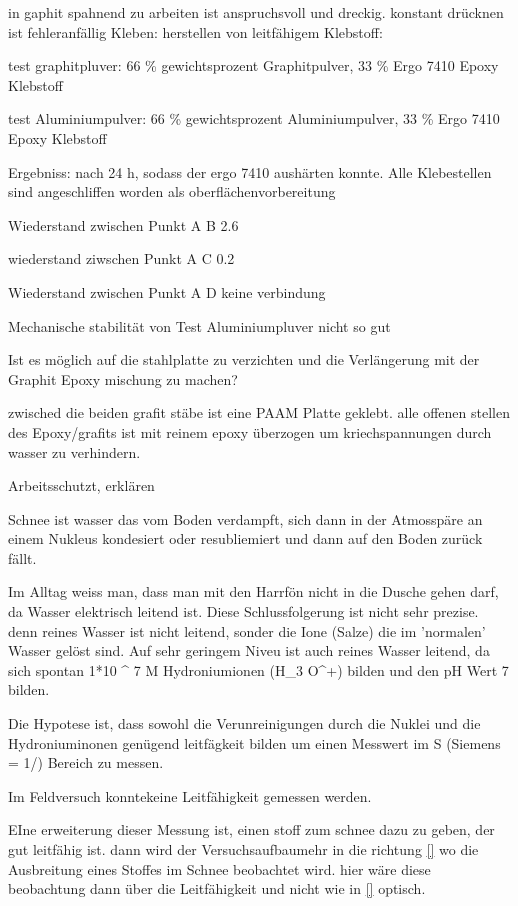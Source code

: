 in gaphit spahnend zu arbeiten ist anspruchsvoll und dreckig.
konstant drücknen ist fehleranfällig
Kleben: herstellen von leitfähigem Klebstoff:

test graphitpluver: 66 \% gewichtsprozent Graphitpulver, 33 \% Ergo 7410 Epoxy Klebstoff

test Aluminiumpulver: 66 \% gewichtsprozent Aluminiumpulver, 33 \% Ergo 7410 Epoxy Klebstoff


Ergebniss: nach 24 h, sodass der ergo 7410 aushärten konnte.
Alle Klebestellen sind angeschliffen worden als oberflächenvorbereitung

Wiederstand zwischen Punkt A B 2.6 \ohm

wiederstand ziwschen Punkt A C 0.2 \ohm

Wiederstand zwischen Punkt A D keine verbindung

Mechanische stabilität von Test Aluminiumpluver nicht so gut

Ist es möglich auf die stahlplatte zu verzichten und die Verlängerung mit der Graphit Epoxy mischung zu machen?

zwisched die beiden grafit stäbe ist eine PAAM Platte geklebt. alle offenen stellen des Epoxy/grafits ist mit reinem epoxy überzogen um kriechspannungen durch wasser zu verhindern.

Arbeitsschutzt, erklären

Schnee ist wasser das vom Boden verdampft, sich dann in der Atmosspäre an einem Nukleus kondesiert oder resubliemiert und dann auf den Boden zurück fällt.

Im Alltag weiss man, dass man mit den Harrfön nicht in die Dusche gehen darf, da Wasser elektrisch leitend ist. Diese Schlussfolgerung ist nicht sehr prezise. denn reines Wasser ist nicht leitend, sonder die  Ione (Salze) die im 'normalen' Wasser gelöst sind. Auf sehr geringem Niveu ist auch reines Wasser leitend, da sich spontan  1*10 ^ 7 M  Hydroniumionen (H_3 O^+) bilden und den pH Wert 7 bilden.

Die Hypotese ist, dass sowohl die Verunreinigungen durch die Nuklei und die Hydroniuminonen genügend leitfägkeit bilden um einen Messwert im \mu S (Siemens = 1/\Ohm) Bereich zu messen.

Im Feldversuch konntekeine Leitfähigkeit gemessen werden.

EIne erweiterung dieser Messung ist, einen stoff zum schnee dazu zu geben, der gut leitfähig ist. dann wird der Versuchsaufbaumehr in die richtung \ref{} wo die Ausbreitung eines Stoffes im Schnee beobachtet wird. hier wäre diese beobachtung dann über die Leitfähigkeit und nicht wie in \ref{} optisch.

